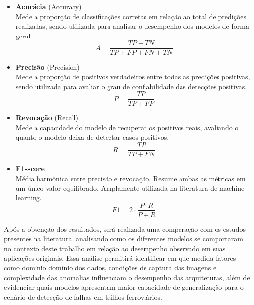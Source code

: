 \begin{itemize}
    \item \textbf{Acurácia} (Accuracy) \\
    Mede a proporção de classificações corretas em relação ao total de predições realizadas, sendo utilizada para analisar o desempenho dos modelos de forma geral.
    \[
        A = \frac{TP + TN}{TP + FP + FN +TN}
    \]

    \item \textbf{Precisão} (Precision)\\
    Mede a proporção de positivos verdadeiros entre todas as predições positivas, sendo utilizada para avaliar o grau de confiabilidade das detecções positivas.
    \[
        P = \frac{TP}{TP + FP}
    \]

    \item \textbf{Revocação} (Recall) \\
    Mede a capacidade do modelo de recuperar os positivos reais, avaliando o quanto o modelo deixa de detectar casos positivos.
    \[
        R = \frac{TP}{TP + FN}
    \]
    
    \item \textbf{F1-score} \\
    Média harmônica entre precisão e revocação.
    Resume ambas as métricas em um único valor equilibrado.
    Amplamente utilizada na literatura de machine learning.
    \[
        F1 = 2 \cdot \frac{P \cdot R}{P + R}
    \]
\end{itemize}

Após a obtenção dos resultados, será realizada uma comparação com os estudos presentes na literatura, analisando como os diferentes modelos se comportaram no contexto deste trabalho em relação ao desempenho observado em suas aplicações originais.
Essa análise permitirá identificar em que medida fatores como domínio domínio dos dados, condições de captura das imagens e complexidade das anomalias influenciam o desempenho das arquiteturas, além de evidenciar quais modelos apresentam maior capacidade de generalização para o cenário de detecção de falhas em trilhos ferroviários.